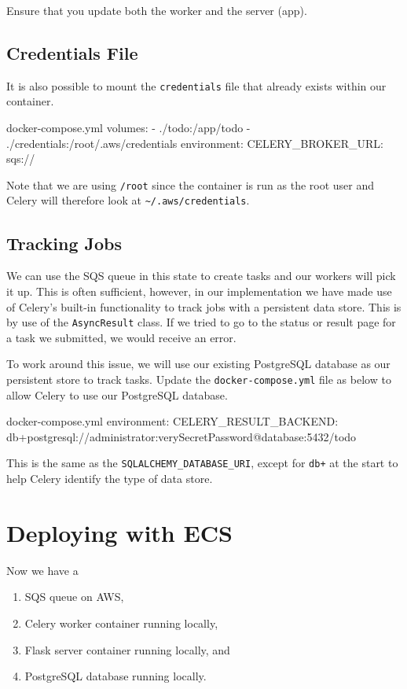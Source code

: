 \documentclass{csse4400}
\begin{document}
\noindent
Ensure that you update both the worker and the server (app).

\subsection{Credentials File}

It is also possible to mount the \texttt{credentials} file that already exists within our container.
%
\begin{code}[numbers=none]{docker-compose.yml}
    volumes:
      - ./todo:/app/todo
      - ./credentials:/root/.aws/credentials
    environment:
      CELERY_BROKER_URL: sqs://
\end{code}

Note that we are using \texttt{/root} since the container is run as the root user and Celery will therefore look at \texttt{\textasciitilde/.aws/credentials}.

\subsection{Tracking Jobs}

We can use the SQS queue in this state to create tasks and our workers will pick it up.
This is often sufficient,
however, in our implementation we have made use of Celery's built-in functionality to track jobs with a persistent data store.
This is by use of the \texttt{AsyncResult} class.
If we tried to go to the status or result page for a task we submitted, we would receive an error.

To work around this issue,
we will use our existing PostgreSQL database as our persistent store to track tasks.
Update the \texttt{docker-compose.yml} file as below to allow Celery to use our PostgreSQL database.
%
\begin{code}[numbers=none]{docker-compose.yml}
    environment:
      CELERY_RESULT_BACKEND: db+postgresql://administrator:verySecretPassword@database:5432/todo
\end{code}

This is the same as the \texttt{SQLALCHEMY\_DATABASE\_URI},
except for \texttt{db+} at the start to help Celery identify the type of data store.


\section{Deploying with ECS}

Now we have a
\begin{enumerate}
    \item SQS queue on AWS,
    \item Celery worker container running locally,
    \item Flask server container running locally, and
    \item PostgreSQL database running locally.
\end{enumerate}
\end{document}
